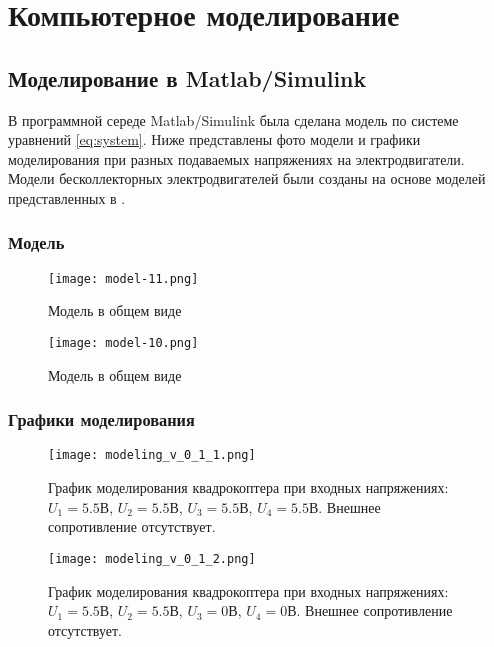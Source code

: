 \chapter{Компьютерное моделирование}
\label{ch:chap1}

\section{Моделирование в Matlab/Simulink}

В программной середе Matlab/Simulink была сделана модель по системе
уравнений \eqref{eq:system}. Ниже представлены фото модели 
и графики моделирования при разных подаваемых напряжениях 
на электродвигатели. Модели бесколлекторных электродвигателей
были созданы на основе моделей представленных в \cite{article}.

\subsection{Модель}


\begin{figure}[ht]
    \centering
    \texttt{[image: model-11.png]}
    \caption{Модель в общем виде}
    \label{fig:model-1}
\end{figure}

\begin{figure}[ht]
    \centering
    \texttt{[image: model-10.png]}
    \caption{Модель в общем виде}
    \label{fig:model-2}
\end{figure}

\newpage

\subsection{Графики моделирования}

\begin{figure}[ht]
    \centering
    \texttt{[image: modeling\_v\_0\_1\_1.png]}
    \caption{График моделирования квадрокоптера при входных напряжениях: \(U_1=5.5\)В, \(U_2=5.5\)В, \(U_3=5.5\)В, \(U_4=5.5\)В. Внешнее сопротивление отсутствует.}
    \label{fig:modeling-1}
\end{figure}

\begin{figure}[ht]
    \centering
    \texttt{[image: modeling\_v\_0\_1\_2.png]}
    \caption{График моделирования квадрокоптера при входных напряжениях: \(U_1=5.5\)В, \(U_2=5.5\)В, \(U_3=0\)В, \(U_4=0\)В. Внешнее сопротивление отсутствует.}
    \label{fig:modeling-2}
\end{figure}

